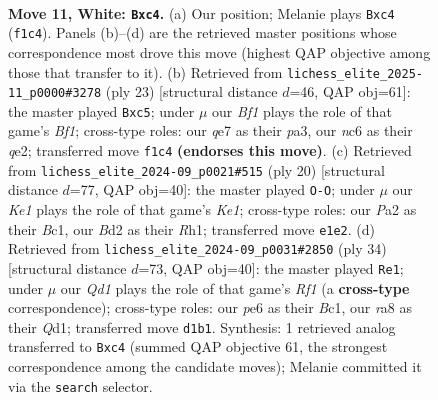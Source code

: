 \documentclass[11pt]{article}
\begin{document}
\clearpage

\begin{figure}[p]\centering
\begin{subfigure}{0.46\textwidth}\centering
\resizebox{\linewidth}{!}{%
\newchessgame
\chessboard[
  setfen={r1b1r1k1/ppp1qppp/2n1pn2/8/2pP3P/4PNP1/PP1B1P2/R2QKB1R w KQ - 0 11},
  showmover=false,
  pgfstyle=straightmove, color=movearrow, markmove={f1-c4}
]}
\caption{}
\end{subfigure}\hfill
\begin{subfigure}{0.46\textwidth}\centering
\resizebox{\linewidth}{!}{%
\newchessgame
\chessboard[
  setfen={r2qkb1r/3b1ppp/p3pn2/1pP5/8/P1N1PN2/1P2QPPP/R1B2RK1 b kq - 0 12},
  showmover=false,
  pgfstyle=straightmove, color=movearrow, markmove={f8-c5}
]}
\caption{}
\end{subfigure}
\\[4pt]
\begin{subfigure}{0.46\textwidth}\centering
\resizebox{\linewidth}{!}{%
\newchessgame
\chessboard[
  setfen={r1bq1rk1/pp3ppp/2n1pn2/8/3pP3/P2B4/1PP1NPPP/R1BQK2R w KQ - 2 11},
  showmover=false,
  pgfstyle=straightmove, color=movearrow, markmove={e1-g1}
]}
\caption{}
\end{subfigure}\hfill
\begin{subfigure}{0.46\textwidth}\centering
\resizebox{\linewidth}{!}{%
\newchessgame
\chessboard[
  setfen={r2n1rk1/1ppqp1bp/4pnp1/1P1p4/3P4/1R3B1P/2P1NPP1/2BQ1RK1 w - - 0 18},
  showmover=false,
  pgfstyle=straightmove, color=movearrow, markmove={f1-e1}
]}
\caption{}
\end{subfigure}
\caption{\textbf{Move 11, White: \texttt{Bxc4}.} (a) Our position; Melanie plays \texttt{Bxc4} (\texttt{f1c4}). Panels (b)--(d) are the retrieved master positions whose correspondence most drove this move (highest QAP objective among those that transfer to it). (b) Retrieved from \texttt{lichess\_elite\_2025-11\_p0000\#3278} (ply 23) [structural distance $d$=46, QAP obj=61]: the master played \texttt{Bxc5}; under $\mu$ our \emph{Bf1} plays the role of that game's \emph{Bf1}; cross-type roles: our \emph{q}e7 as their \emph{p}a3, our \emph{n}c6 as their \emph{q}e2; transferred move \texttt{f1c4} \textbf{(endorses this move)}. (c) Retrieved from \texttt{lichess\_elite\_2024-09\_p0021\#515} (ply 20) [structural distance $d$=77, QAP obj=40]: the master played \texttt{O-O}; under $\mu$ our \emph{Ke1} plays the role of that game's \emph{Ke1}; cross-type roles: our \emph{P}a2 as their \emph{B}c1, our \emph{B}d2 as their \emph{R}h1; transferred move \texttt{e1e2}. (d) Retrieved from \texttt{lichess\_elite\_2024-09\_p0031\#2850} (ply 34) [structural distance $d$=73, QAP obj=40]: the master played \texttt{Re1}; under $\mu$ our \emph{Qd1} plays the role of that game's \emph{Rf1} (a \textbf{cross-type} correspondence); cross-type roles: our \emph{p}e6 as their \emph{B}c1, our \emph{r}a8 as their \emph{Q}d1; transferred move \texttt{d1b1}. Synthesis: 1 retrieved analog transferred to \texttt{Bxc4} (summed QAP objective 61, the strongest correspondence among the candidate moves); Melanie committed it via the \texttt{search} selector.}
\label{fig:thought-m20}
\end{figure}
\end{document}
